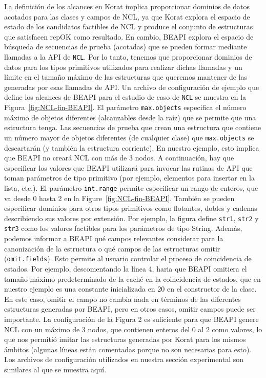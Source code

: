 La definición de los alcances en \textsf{Korat} implica proporcionar dominios de datos acotados para las clases y campos de NCL, ya que \textsf{Korat} explora el espacio de estado de los candidatos factibles de NCL y produce el conjunto de estructuras que satisfacen repOK como resultado. En cambio, \textsf{BEAPI} explora el espacio de búsqueda de secuencias de prueba (acotadas) que se pueden formar mediante llamadas a la API de \texttt{NCL}. Por lo tanto, tenemos que proporcionar dominios de datos para los tipos primitivos utilizados para realizar dichas llamadas y un límite en el tamaño máximo de las estructuras que queremos mantener de las generadas por esas llamadas de API. Un archivo de configuración de ejemplo que define los alcances de \textsf{BEAPI} para el estudio de caso de \texttt{NCL} se muestra en la Figura~\ref{fig:NCL-fin-BEAPI}. El parámetro \texttt{max.objects} especifica el número máximo de objetos diferentes (alcanzables desde la raíz) que se permite que una estructura tenga. Las secuencias de prueba que crean una estructura que contiene un número mayor de objetos diferentes (de cualquier clase) que \texttt{max.objects} se descartarán (y también la estructura corriente). En nuestro ejemplo, esto implica que \textsf{BEAPI} no creará NCL con más de 3 nodos. A continuación, hay que especificar los valores que \textsf{BEAPI} utilizará para invocar las rutinas de API que toman parámetros de tipo primitivo (por ejemplo, elementos para insertar en la lista, etc.). El parámetro \texttt{int.range} permite especificar un rango de enteros, que va desde 0 hasta 2 en la Figure~\ref{fig:NCL-fin-BEAPI}. También se pueden especificar dominios para otros tipos primitivos como flotantes, dobles y cadenas describiendo sus valores por extensión. Por ejemplo, la figura define \texttt{str1}, \texttt{str2} y \texttt{str3} como los valores factibles para los parámetros de tipo String. Además, podemos informar a \textsf{BEAPI} qué campos relevantes considerar para la canonización de la estructura o qué campos de las estructuras omitir (\texttt{omit.fields}). Esto permite al usuario controlar el proceso de coincidencia de estados. Por ejemplo, descomentando la línea 4, haria que \textsf{BEAPI} omitiera el tamaño máximo predeterminado de la caché en la coincidencia de estados, que en nuestro ejemplo es una constante inicializada en 20 en el constructor de la clase. En este caso, omitir el campo no cambia nada en términos de las diferentes estructuras generadas por \textsf{BEAPI}, pero en otros casos, omitir campos puede ser importante. La configuración de la Figura 2 es suficiente para que \textsf{BEAPI} genere NCL con un máximo de 3 nodos, que contienen enteros del 0 al 2 como valores, lo que nos permitió imitar las estructuras generadas por Korat para los mismos ámbitos (algunas líneas están comentadas porque no son necesarias para esto). Los archivos de configuración utilizados en nuestra sección experimental son similares al que se muestra aquí.

